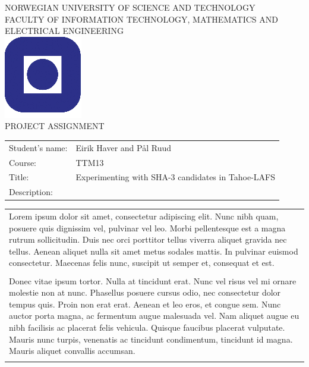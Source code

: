 %
\begin{titlepage}
\begin{center}
\textsc{NORWEGIAN UNIVERSITY OF SCIENCE AND TECHNOLOGY\\
FACULTY OF  INFORMATION TECHNOLOGY, MATHEMATICS AND ELECTRICAL ENGINEERING} \\
\vspace{0.5cm} 
\includegraphics[scale=0.5]{NTNU-logo} \\

\vspace{1.0cm}
{\Huge{PROJECT ASSIGNMENT}}
\vspace{1.0cm}

\begin{tabular}{ p{4cm} p{11cm}}

Student's name:	& Eirik Haver and Pål Ruud \\
Course: & TTM13 \\
Title: & Experimenting with SHA-3 candidates in Tahoe-LAFS \\
Description: & \\
\end{tabular}
{\small{\begin{tabular}{p{15cm}}
\vspace{0.2cm}
Lorem ipsum dolor sit amet, consectetur adipiscing elit. Nunc nibh quam, posuere quis dignissim vel, pulvinar vel leo. Morbi pellentesque est a magna rutrum sollicitudin. Duis nec orci porttitor tellus viverra aliquet gravida nec tellus. Aenean aliquet nulla sit amet metus sodales mattis. In pulvinar euismod consectetur. Maecenas felis nunc, suscipit ut semper et, consequat et est. 
\\\\
Donec vitae ipsum tortor. Nulla at tincidunt erat. Nunc vel risus vel mi ornare molestie non at nunc. Phasellus posuere cursus odio, nec consectetur dolor tempus quis. Proin non erat erat. Aenean et leo eros, et congue sem. Nunc auctor porta magna, ac fermentum augue malesuada vel. Nam aliquet augue eu nibh facilisis ac placerat felis vehicula. Quisque faucibus placerat vulputate. Mauris nunc turpis, venenatis ac tincidunt condimentum, tincidunt id magna. Mauris aliquet convallis accumsan. 
\\\\
\end{tabular}  }}


\end{center}
\end{titlepage}

